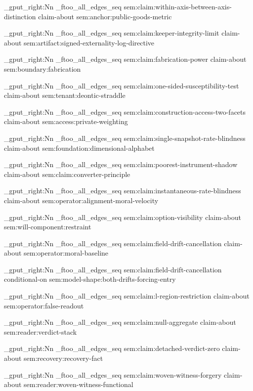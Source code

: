 \seq_gput_right:Nn \g_ftoo_all_edges_seq { { sem:claim:within-axis-between-axis-distinction } { claim-about } { sem:anchor:public-goods-metric } }

\seq_gput_right:Nn \g_ftoo_all_edges_seq { { sem:claim:keeper-integrity-limit } { claim-about } { sem:artifact:signed-externality-log-directive } }

\seq_gput_right:Nn \g_ftoo_all_edges_seq { { sem:claim:fabrication-power } { claim-about } { sem:boundary:fabrication } }

\seq_gput_right:Nn \g_ftoo_all_edges_seq { { sem:claim:one-sided-susceptibility-test } { claim-about } { sem:tenant:deontic-straddle } }

\seq_gput_right:Nn \g_ftoo_all_edges_seq { { sem:claim:construction-access-two-facets } { claim-about } { sem:access:private-weighting } }

\seq_gput_right:Nn \g_ftoo_all_edges_seq { { sem:claim:single-snapshot-rate-blindness } { claim-about } { sem:foundation:dimensional-alphabet } }

\seq_gput_right:Nn \g_ftoo_all_edges_seq { { sem:claim:poorest-instrument-shadow } { claim-about } { sem:claim:converter-principle } }

\seq_gput_right:Nn \g_ftoo_all_edges_seq { { sem:claim:instantaneous-rate-blindness } { claim-about } { sem:operator:alignment-moral-velocity } }

\seq_gput_right:Nn \g_ftoo_all_edges_seq { { sem:claim:option-visibility } { claim-about } { sem:will-component:restraint } }

\seq_gput_right:Nn \g_ftoo_all_edges_seq { { sem:claim:field-drift-cancellation } { claim-about } { sem:operator:moral-baseline } }

\seq_gput_right:Nn \g_ftoo_all_edges_seq { { sem:claim:field-drift-cancellation } { conditional-on } { sem:model-shape:both-drifts-forcing-entry } }

\seq_gput_right:Nn \g_ftoo_all_edges_seq { { sem:claim:l-region-restriction } { claim-about } { sem:operator:false-readout } }

\seq_gput_right:Nn \g_ftoo_all_edges_seq { { sem:claim:null-aggregate } { claim-about } { sem:reader:verdict-stack } }

\seq_gput_right:Nn \g_ftoo_all_edges_seq { { sem:claim:detached-verdict-zero } { claim-about } { sem:recovery:recovery-fact } }

\seq_gput_right:Nn \g_ftoo_all_edges_seq { { sem:claim:woven-witness-forgery } { claim-about } { sem:reader:woven-witness-functional } }

